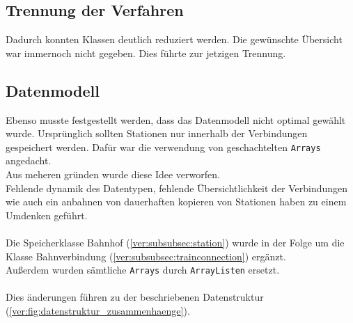\subsection{Trennung der Verfahren}
Dadurch konnten Klassen deutlich reduziert werden. Die gewünschte Übersicht war immernoch nicht gegeben. Dies führte zur jetzigen Trennung.\\

\subsection{Datenmodell}
Ebenso musste festgestellt werden, dass das Datenmodell nicht optimal gewählt wurde. Ursprünglich sollten Stationen nur innerhalb der Verbindungen gespeichert werden. Dafür war die verwendung von geschachtelten \texttt{Arrays} angedacht.\\
Aus meheren gründen wurde diese Idee verworfen.\\
Fehlende dynamik des Datentypen, fehlende Übersichtlichkeit der Verbindungen wie auch ein anbahnen von dauerhaften kopieren von Stationen haben zu einem Umdenken geführt.\\
\\
Die Speicherklasse Bahnhof (\ref{ver:subsubsec:station}) wurde in der Folge um die Klasse Bahnverbindung (\ref{ver:subsubsec:trainconnection}) ergänzt.\\
Außerdem wurden sämtliche \texttt{Arrays} durch \texttt{ArrayListen} ersetzt.\\
\\
Dies änderungen führen zu der beschriebenen Datenstruktur (\ref{ver:fig:datenstruktur_zusammenhaenge}).\\